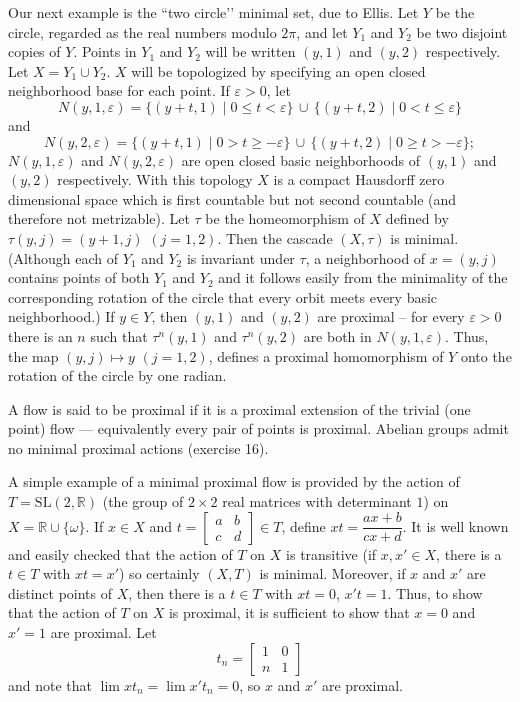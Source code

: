 Our next example is the “two circle’’ minimal set, due to Ellis. Let $Y$ be the circle, regarded as the real numbers modulo $2\pi$, and let $Y_1$ and $Y_2$ be two disjoint copies of $Y$. Points in $Y_1$ and $Y_2$ will be written $(y,1)$ and $(y,2)$ respectively. Let $X=Y_1\cup Y_2$. $X$ will be topologized by specifying an open closed neighborhood base for each point. If $\varepsilon>0$, let
\[
    N(y,1,\varepsilon)=\{(y+t,1)\mid 0\le t<\varepsilon\}\,\cup\,\{(y+t,2)\mid 0<t\le \varepsilon\}
\]
and
\[
    N(y,2,\varepsilon)=\{(y+t,1)\mid 0>t\ge -\varepsilon\}\,\cup\,\{(y+t,2)\mid 0\ge t>-\varepsilon\};
\]
$N(y,1,\varepsilon)$ and $N(y,2,\varepsilon)$ are open closed basic neighborhoods of $(y,1)$ and $(y,2)$ respectively. With this topology $X$ is a compact Hausdorff zero dimensional space which is first countable but not second countable (and therefore not metrizable). Let $\tau$ be the homeomorphism of $X$ defined by $\tau(y,j)=(y+1,j)$ $(j=1,2)$. Then the cascade $(X,\tau)$ is minimal. (Although each of $Y_1$ and $Y_2$ is invariant under $\tau$, a neighborhood of $x=(y,j)$ contains points of both $Y_1$ and $Y_2$ and it follows easily from the minimality of the corresponding rotation of the circle that every orbit meets every basic neighborhood.) If $y\in Y$, then $(y,1)$ and $(y,2)$ are proximal -- for every $\varepsilon>0$ there is an $n$ such that $\tau^n(y,1)$ and $\tau^n(y,2)$ are both in $N(y,1,\varepsilon)$. Thus, the map $(y,j)\mapsto y$ $(j=1,2)$, defines a proximal homomorphism of $Y$ onto the rotation of the circle by one radian.


A flow is said to be proximal if it is a proximal extension of the trivial (one point) flow — equivalently every pair of points is proximal. Abelian groups admit no minimal proximal actions (exercise 16).

A simple example of a minimal proximal flow is provided by the action of $T = \mathrm{SL}(2,\mathbb{R})$ (the group of $2 \times 2$ real matrices with determinant $1$) on $X = \mathbb{R} \cup \{\omega\}$. If $x \in X$ and $t = \begin{bmatrix} a & b \\ c & d \end{bmatrix} \in T$, define $x t = \dfrac{a x + b}{c x + d}$. It is well known and easily checked that the action of $T$ on $X$ is transitive (if $x, x' \in X$, there is a $t \in T$ with $x t = x'$) so certainly $(X, T)$ is minimal. Moreover, if $x$ and $x'$ are distinct points of $X$, then there is a $t \in T$ with $x t = 0$, $x' t = 1$. Thus, to show that the action of $T$ on $X$ is proximal, it is sufficient to show that $x = 0$ and $x' = 1$ are proximal. Let
\[
    t_n = \begin{bmatrix} 1 & 0 \\ n & 1 \end{bmatrix}
\]
and note that $\lim x t_n = \lim x' t_n = 0$, so $x$ and $x'$ are proximal.

